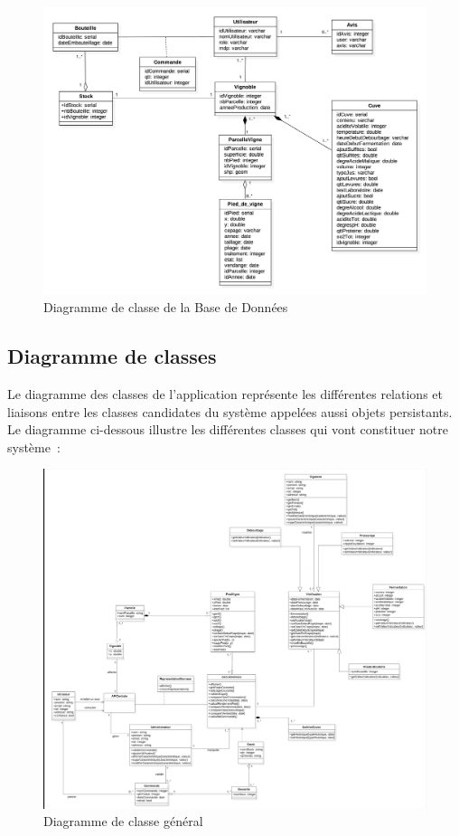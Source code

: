 \documentclass[a4paper, titlepage]{report}
\begin{document}
\clearpage
\begin{figure}[!ht]
\centering
\includegraphics{Images/DiagrammeClasseBDD.jpg}
\caption{Diagramme de classe de la Base de Données}
\end{figure}

\clearpage
\subsection{Diagramme de classes}\label{diagramme-de-classes}

Le diagramme des classes de l'application représente les différentes
relations et liaisons entre les classes candidates du système appelées
aussi objets persistants. Le diagramme ci-dessous illustre les
différentes classes qui vont constituer notre système~:

\begin{figure}[!ht]
\centering
\includegraphics{Images/DiagrammeClasse.png}
\caption{Diagramme de classe général}
\end{figure}
\end{document}
